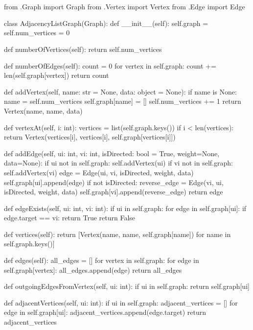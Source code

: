 \documentclass{article}
\begin{document}
\section{} %
\begin{python}
from .Graph import Graph
from .Vertex import Vertex
from .Edge import Edge



class AdjacencyListGraph(Graph):
    def __init__(self):
        self.graph = {}
        self.num_vertices = 0

    def numberOfVertices(self):
        return self.num_vertices

    def numberOfEdges(self):
        count = 0
        for vertex in self.graph:
            count += len(self.graph[vertex])
        return count

    def addVertex(self, name: str = None, data: object = None):
        if name is None:
            name = self.num_vertices
        self.graph[name] = []
        self.num_vertices += 1
        return Vertex(name, name, data)

    def vertexAt(self, i: int):
        vertices = list(self.graph.keys())
        if i < len(vertices):
            return Vertex(vertices[i], vertices[i], self.graph[vertices[i]])

    def addEdge(self, ui: int, vi: int, isDirected: bool = True, weight=None, data=None):
        if ui not in self.graph:
            self.addVertex(ui)
        if vi not in self.graph:
            self.addVertex(vi)
        edge = Edge(ui, vi, isDirected, weight, data)
        self.graph[ui].append(edge)
        if not isDirected:
            reverse_edge = Edge(vi, ui, isDirected, weight, data)
            self.graph[vi].append(reverse_edge)
        return edge

    def edgeExists(self, ui: int, vi: int):
        if ui in self.graph:
            for edge in self.graph[ui]:
                if edge.target == vi:
                    return True
        return False

    def vertices(self):
        return [Vertex(name, name, self.graph[name]) for name in self.graph.keys()]

    def edges(self):
        all_edges = []
        for vertex in self.graph:
            for edge in self.graph[vertex]:
                all_edges.append(edge)
        return all_edges

    def outgoingEdgesFromVertex(self, ui: int):
        if ui in self.graph:
            return self.graph[ui]

    def adjacentVertices(self, ui: int):
        if ui in self.graph:
            adjacent_vertices = []
            for edge in self.graph[ui]:
                adjacent_vertices.append(edge.target)
            return adjacent_vertices
\end{python}
\href{https://github.com/aejunior/bsi-ed-ii/blob/master/src/graph/alg.py}{\faGithub}
\end{document}
